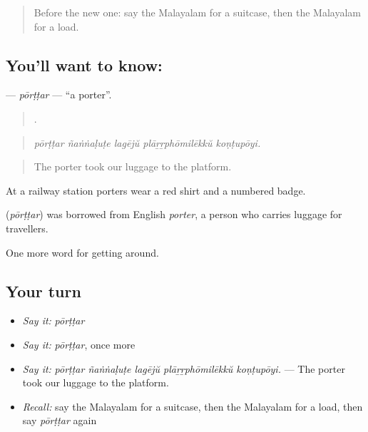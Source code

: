 \label{lesson:ML-C466-porttar}



\begin{quote}
Before the new one: say the Malayalam for a suitcase, then the Malayalam for a load.
\end{quote}

\subsection*{You'll want to know: }
\textbf{} — \emph{pōrṭṭar} — \textquotedblleft{}a porter\textquotedblright{}.

\begin{quote}
    .
\end{quote}

\begin{quote}
\emph{pōrṭṭar ñaṅṅaḷuṭe lagējŭ plāṟṟphōmilēkkŭ koṇṭupōyi.}
\end{quote}

\begin{quote}
The porter took our luggage to the platform.
\end{quote}

At a railway station porters wear a red shirt and a numbered badge.

\begin{cousinweb}
\textbf{} (\emph{pōrṭṭar}) was borrowed from English \emph{porter}, a person who carries luggage for travellers.
\end{cousinweb}

\begin{grammarlens}[title={What you've built}]
One more word for getting around.
\end{grammarlens}

\subsection*{Your turn}
\begin{itemize}
\raggedright
  \item \emph{Say it:} \emph{pōrṭṭar}
  \item \emph{Say it:} \emph{pōrṭṭar}, once more
  \item \emph{Say it:} \emph{pōrṭṭar ñaṅṅaḷuṭe lagējŭ plāṟṟphōmilēkkŭ koṇṭupōyi.} — The porter took our luggage to the platform.
  \item \emph{Recall:} say the Malayalam for a suitcase, then the Malayalam for a load, then say \emph{pōrṭṭar} again
\end{itemize}

